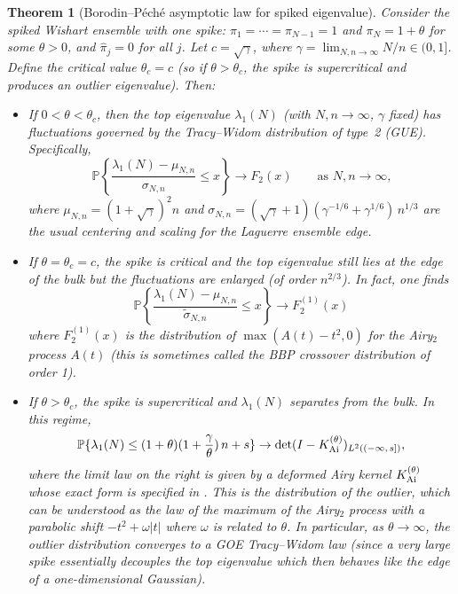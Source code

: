 \documentclass[letterpaper,11pt,oneside,reqno]{article}
\numberwithin{equation}{section}
\newtheorem{theorem}[proposition]{Theorem}
\theoremstyle{definition}
\begin{document}
\begin{theorem}[Borodin--P\'ech\'e asymptotic law for spiked eigenvalue]\label{thm:BP-limit}
Consider the spiked Wishart ensemble with one spike: $\pi_1=\cdots=\pi_{N-1}=1$ and $\pi_N = 1+\theta$ for some $\theta>0$, and $\hat\pi_j=0$ for all $j$. Let $c = \sqrt{\gamma}$, where $\gamma = \lim_{N,n\to\infty} N/n \in(0,1]$. Define the critical value $\theta_c = c$ (so if $\theta>\theta_c$, the spike is supercritical and produces an outlier eigenvalue). Then:
\begin{itemize}\item If $0<\theta < \theta_c$, then the top eigenvalue $\lambda_1(N)$ (with $N,n\to\infty$, $\gamma$ fixed) has fluctuations governed by the Tracy--Widom distribution of type~2 (GUE). Specifically,
\[ \mathbb{P}\left\{\frac{\lambda_1(N) - \mu_{N,n}}{\sigma_{N,n}} \le x\right\} \to F_2(x) \qquad \text{as $N,n\to\infty$,}\]
where $\mu_{N,n} = (1+\sqrt{\gamma})^2 n$ and $\sigma_{N,n} = (\sqrt{\gamma}+1)(\gamma^{-1/6}+\gamma^{1/6})\, n^{1/3}$ are the usual centering and scaling for the Laguerre ensemble edge.
\item If $\theta = \theta_c = c$, the spike is critical and the top eigenvalue still lies at the edge of the bulk but the fluctuations are enlarged (of order $n^{2/3}$). In fact, one finds
\[ \mathbb{P}\left\{\frac{\lambda_1(N) - \mu_{N,n}}{\tilde\sigma_{N,n}} \le x\right\} \to F_2^{(1)}(x) \]
where $F_2^{(1)}(x)$ is the distribution of $\max(A(t)-t^2,0)$ for the Airy$_2$ process $A(t)$ (this is sometimes called the BBP crossover distribution of order 1).
\item If $\theta > \theta_c$, the spike is supercritical and $\lambda_1(N)$ separates from the bulk. In this regime,
\[ \mathbb{P}\{\lambda_1(N) \le (1+\theta)(1+\frac{\gamma}{\theta})\, n + s\} \to \det(I - K_{\rm Ai}^{(\theta)})_{L^2((-\infty,\,s])},\]
where the limit law on the right is given by a deformed Airy kernel $K_{\rm Ai}^{(\theta)}$ whose exact form is specified in \cite{BorodinPeche2008}. This is the distribution of the outlier, which can be understood as the law of the maximum of the Airy$_2$ process with a parabolic shift $-t^2 + \omega |t|$ where $\omega$ is related to $\theta$. In particular, as $\theta\to\infty$, the outlier distribution converges to a GOE Tracy--Widom law (since a very large spike essentially decouples the top eigenvalue which then behaves like the edge of a one-dimensional Gaussian).
\end{itemize}
\end{theorem}
\end{document}
